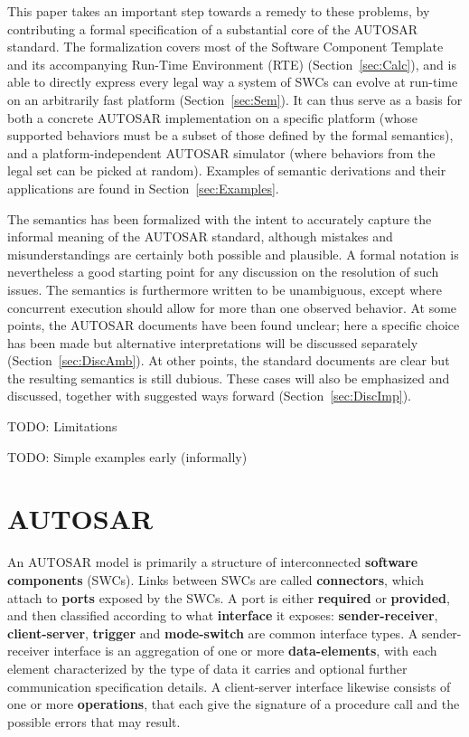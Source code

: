 \documentclass[twocolumn]{article}
\begin{document}
This paper takes an important step towards a remedy to these problems, by contributing a formal specification of a substantial core of the AUTOSAR standard. The formalization covers most of the Software Component Template and its accompanying Run-Time Environment (RTE) (Section~\ref{sec:Calc}), and is able to directly express every legal way a system of SWCs can evolve at run-time on an arbitrarily fast platform (Section~\ref{sec:Sem}). It can thus serve as a basis for both a concrete AUTOSAR implementation on a specific platform (whose supported behaviors must be a subset of those defined by the formal semantics), and a platform-independent AUTOSAR simulator (where behaviors from the legal set can be picked at random). Examples of semantic derivations and their applications are found in Section~\ref{sec:Examples}.

The semantics has been formalized with the intent to accurately capture the informal meaning of the AUTOSAR standard, although mistakes and misunderstandings are certainly both possible and plausible. A formal notation is nevertheless a good starting point for any discussion on the resolution of such issues. The semantics is furthermore written to be unambiguous, except where concurrent execution should allow for more than one observed behavior. At some points, the AUTOSAR documents have been found unclear; here a specific choice has been made but alternative interpretations will be discussed separately (Section~\ref{sec:DiscAmb}). At other points, the standard documents are clear but the resulting semantics is still dubious. These cases will also be emphasized and discussed, together with suggested ways forward (Section~\ref{sec:DiscImp}).


TODO: Limitations

TODO: Simple examples early (informally)

\section{AUTOSAR}
\label{sec:autosar}

An AUTOSAR model is primarily a structure of interconnected \textbf{software components} (SWCs). Links between SWCs are called \textbf{connectors}, which attach to \textbf{ports} exposed by the SWCs. A port is either \textbf{required} or \textbf{provided}, and then classified according to what \textbf{interface} it exposes: \textbf{sender-receiver}, \textbf{client-server}, \textbf{trigger} and \textbf{mode-switch} are common interface types. A sender-receiver interface is an aggregation of one or more \textbf{data-elements}, with each element characterized by the type of data it carries and optional further communication specification details. A client-server interface likewise consists of one or more \textbf{operations}, that each give the signature of a procedure call and the possible errors that may result.
\end{document}
